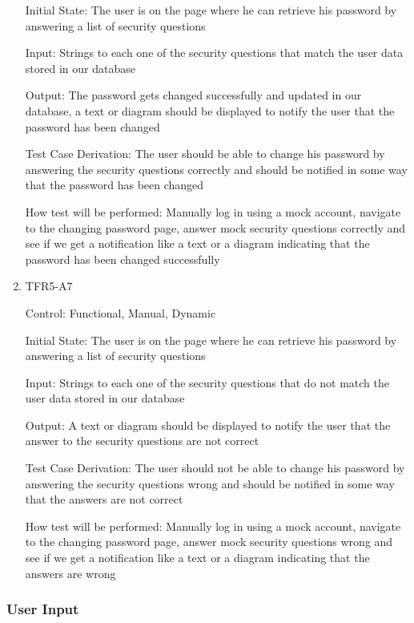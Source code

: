 \documentclass[12pt, titlepage]{article}
\begin{document}
\begin{enumerate}
  Initial State: The user is on the page where he can retrieve his password by answering a list of security questions
            
  Input:  Strings to each one of the security questions that match the user data stored in our database
            
  Output: The password gets changed successfully and updated in our database, a text or diagram should be displayed to notify the user that the password has been changed 
  
  Test Case Derivation: The user should be able to change his password by answering the security questions correctly and should be notified in some way that the password has been changed
            
  How test will be performed: Manually log in using a mock account, navigate to the changing password page, answer mock security questions correctly and see if we get a notification like a text or a diagram indicating that the password has been changed successfully
  
  \item{TFR5-A7\\} \label{TFR5-A7}
  
  Control: Functional, Manual, Dynamic
            
  Initial State: The user is on the page where he can retrieve his password by answering a list of security questions
            
  Input:  Strings to each one of the security questions that do not match the user data stored in our database
            
  Output: A text or diagram should be displayed to notify the user that the answer to the security questions are not correct
  
  Test Case Derivation: The user should not be able to change his password by answering the security questions wrong and should be notified in some way that the answers are not correct
            
  How test will be performed: Manually log in using a mock account, navigate to the changing password page, answer mock security questions wrong and see if we get a notification like a text or a diagram indicating that the answers are wrong
  
  \end{enumerate}
  
  \subsubsection{User Input}
  
\end{document}
